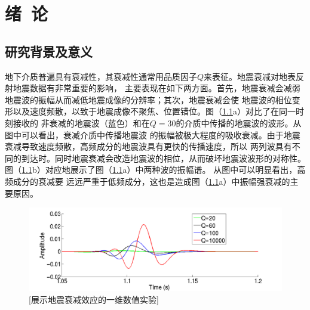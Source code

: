


\newcommand{\citeA}[2]{\citeauthor{#1}\cite{#1}}

\chapter{绪~论}

\section{研究背景及意义}
地下介质普遍具有衰减性，其衰减性通常用品质因子$Q$来表征。地震衰减对地表反射地震数据有非常重要的影响，
主要表现在如下两方面。首先，地震衰减会减弱地震波的振幅从而减低地震成像的分辨率；其次，地震衰减会使
地震波的相位变形以及速度频散，以致于地震成像不聚焦、位置错位。图（\ref{fig:spectral}a）对比了在同一时刻接收的
非衰减的地震波（蓝色）和在$Q=30$的介质中传播的地震波的波形。从图中可以看出，衰减介质中传播地震波
的振幅被极大程度的吸收衰减。由于地震衰减导致速度频散，高频成分的地震波具有更快的传播速度，所以
两列波具有不同的到达时。同时地震衰减会改造地震波的相位，从而破坏地震波波形的对称性。
图（\ref{fig:spectral}b）对应地展示了图（\ref{fig:spectral}a）中两种波的振幅谱。
从图中可以明显看出，高频成分的衰减要
远远严重于低频成分，这也是造成图（\ref{fig:spectral}a）中振幅强衰减的主要原因。

\begin{figure}[!htbp]
        \centering
        \includegraphics[width=0.9\linewidth]{figure/spectral}
        [展示地震衰减效应的一维数值实验]
        \label{fig:spectral}
\end{figure}


